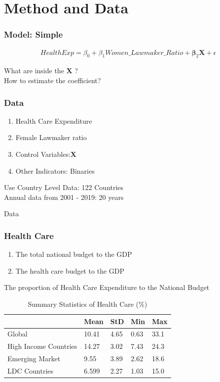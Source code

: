 \documentclass[12pt]{beamer}
\begin{document}
\section{Method and Data}

\begin{frame}
	\frametitle{Model: Simple}
	\begin{center}
		\begin{align*}
			HealthExp = \beta_0 + \beta_1Women\_Lawmaker\_Ratio + \boldsymbol\beta_2\mathbf{X} + \epsilon 
		\end{align*}
	\end{center}\pause
\begin{center}
	What are inside the $\mathbf{X}$ ?\\
	How to estimate the coefficient?
\end{center}

\end{frame}

\begin{frame}
	\frametitle{Data}
	\begin{enumerate}
		\item Health Care Expenditure
		\item Female Lawmaker ratio
		\item Control Variables:$\mathbf{X}$
		\item Other Indicators: Binaries
	\end{enumerate}
Use Country Level Data: 122 Countries\\
Annual data from 2001 - 2019: 20 years
\end{frame}

\begin{frame}{Data}
\frametitle{Health Care}

\begin{enumerate}
	\item The total national budget to the GDP
	\item The health care budget to the GDP
\end{enumerate}
\begin{center}
\alert{The proportion of Health Care Expenditure to the National Budget}
\end{center}

\begin{table}
\centering
\begin{tabular}{lllll} 
\hline
                     & Mean  & StD  & Min  & Max   \\ 
\hline
Global & 10.41 & 4.65 & 0.63 & 33.1  \\
High Income Countries  & 14.27 & 3.02 & 7.43 & 24.3  \\
Emerging Market & 9.55  & 3.89 & 2.62 & 18.6  \\
LDC Countries   & 6.599 & 2.27 & 1.03 & 15.0 \\
\hline
\end{tabular}
\caption{Summary Statistics of Health Care (\%)}
\label{Health Care Summary}
\end{table}
	
\end{frame}
\end{document}
